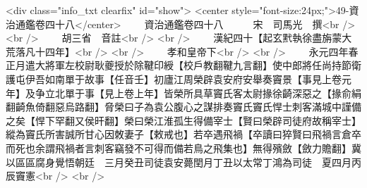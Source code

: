 <div class="info_txt clearfix" id="show">
<center style="font-size:24px;">49-資治通鑑卷四十八</center>
  　　資治通鑑卷四十八　　　宋　司馬光　撰<br />
<br />
　　胡三省　音註<br />
<br />
　　漢紀四十【起玄黓執徐盡旃蒙大荒落凡十四年】<br />
<br />
　　孝和皇帝下<br />
<br />
　　永元四年春正月遣大將軍左校尉耿夔授於除鞬印綬【校戶教翻鞬九言翻】使中郎將任尚持節衛護屯伊吾如南單于故事【任音壬】初廬江周榮辟袁安府安舉奏竇景【事見上卷元年】及争立北單于事【見上卷上年】皆榮所具草竇氏客太尉掾徐齮深惡之【掾俞絹翻齮魚倚翻惡烏路翻】脅榮曰子為袁公腹心之謀排奏竇氏竇氏悍士刺客滿城中謹備之矣【悍下罕翻又侯旰翻】榮曰榮江淮孤生得備宰士【賢曰榮辟司徒府故稱宰士】縱為竇氏所害誠所甘心因敇妻子【敕戒也】若卒遇飛禍【卒讀曰猝賢曰飛禍言倉卒而死也余謂飛禍者言刺客竊發不可得而備若鳥之飛集也】無得殯斂【斂力贍翻】冀以區區腐身覺悟朝廷　三月癸丑司徒袁安薨閏月丁丑以太常丁鴻為司徒　夏四月丙辰竇憲<br />
<br />
